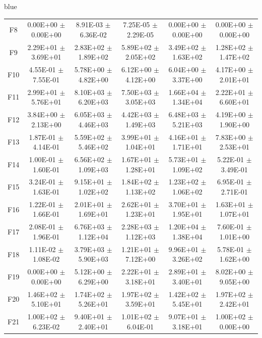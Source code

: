 \documentclass[journal, onecolumn]{IEEEtran}
\begin{document}
\begin{color}{blue}
\begin{table}[htbp!]
\begin{tabular}{c|ccccc}
			F8	 &	0.00E+00	$\pm$	0.00E+00		 &	8.91E-03	$\pm$	6.36E-02		 &	7.25E-05	$\pm$	2.29E-05		 &	0.00E+00	$\pm$	0.00E+00		 &	0.00E+00	$\pm$	0.00E+00	\\	
			F9	 &	2.29E+01	$\pm$	3.69E+01		 &	2.83E+02	$\pm$	1.89E+02		 &	5.89E+02	$\pm$	2.05E+02		 &	3.49E+02	$\pm$	1.63E+02		 &	1.28E+02	$\pm$	1.47E+02	\\	
			F10	 &	4.55E-01	$\pm$	7.55E-01		 &	5.78E+00	$\pm$	4.82E+00		 &	6.12E+00	$\pm$	4.12E+00		 &	6.04E+00	$\pm$	3.37E+00		 &	4.17E+00	$\pm$	2.01E+01	\\	
			F11	 &	2.99E+01	$\pm$	5.76E+01		 &	8.10E+03	$\pm$	6.20E+03		 &	7.50E+03	$\pm$	3.05E+03		 &	1.66E+04	$\pm$	1.34E+04		 &	2.22E+01	$\pm$	6.60E+01	\\	
			F12	 &	3.84E+00	$\pm$	2.13E+00		 &	6.05E+03	$\pm$	4.46E+03		 &	4.42E+03	$\pm$	1.49E+03		 &	6.48E+03	$\pm$	5.21E+03		 &	4.19E+00	$\pm$	1.90E+00	\\	
			F13	 &	1.87E-01	$\pm$	4.14E-01		 &	5.59E+02	$\pm$	5.46E+02		 &	3.99E+01	$\pm$	1.04E+01		 &	4.16E+01	$\pm$	1.71E+01		 &	7.83E+00	$\pm$	2.53E+01	\\	
			F14	 &	1.00E-01	$\pm$	1.60E-01		 &	6.56E+02	$\pm$	1.09E+03		 &	1.67E+01	$\pm$	1.28E+01		 &	5.73E+01	$\pm$	1.09E+02		 &	5.22E-01	$\pm$	3.49E-01	\\	
			F15	 &	3.24E-01	$\pm$	1.63E-01		 &	9.15E+01	$\pm$	1.02E+02		 &	1.84E+02	$\pm$	1.13E+02		 &	1.23E+02	$\pm$	1.06E+02		 &	6.95E-01	$\pm$	2.71E-01	\\	
			F16	 &	1.22E-01	$\pm$	1.66E-01		 &	2.01E+01	$\pm$	1.69E+01		 &	2.62E+01	$\pm$	1.23E+01		 &	3.70E+01	$\pm$	1.95E+01		 &	1.63E+01	$\pm$	1.07E+01	\\	
			F17	 &	2.08E-01	$\pm$	1.96E-01		 &	6.76E+03	$\pm$	1.12E+04		 &	2.28E+03	$\pm$	1.12E+03		 &	1.20E+04	$\pm$	1.38E+04		 &	7.60E-01	$\pm$	1.01E+00	\\	
			F18	 &	1.11E-02	$\pm$	1.08E-02		 &	3.79E+03	$\pm$	5.90E+03		 &	1.21E+01	$\pm$	7.12E+00		 &	9.96E+01	$\pm$	3.26E+02		 &	5.78E-01	$\pm$	1.62E+00	\\	
			F19	 &	0.00E+00	$\pm$	0.00E+00		 &	5.12E+00	$\pm$	6.29E+00		 &	2.22E+01	$\pm$	3.18E+01		 &	2.89E+01	$\pm$	3.40E+01		 &	8.02E+00	$\pm$	9.05E+00	\\	
			F20	 &	1.46E+02	$\pm$	5.10E+01		 &	1.74E+02	$\pm$	5.26E+01		 &	1.97E+02	$\pm$	3.59E+01		 &	1.42E+02	$\pm$	5.45E+01		 &	1.97E+02	$\pm$	2.42E+01	\\	
			F21	 &	1.00E+02	$\pm$	6.23E-02		 &	9.40E+01	$\pm$	2.40E+01		 &	1.01E+02	$\pm$	6.04E-01		 &	9.07E+01	$\pm$	3.18E+01		 &	1.00E+02	$\pm$	0.00E+00	\\	

\end{tabular}
\end{table}
\end{color}
\end{document}
